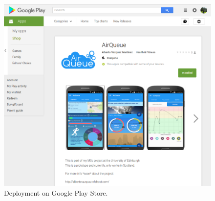 \begin{figure}[H]
\begin{adjustbox}{width=.9\textwidth,center=\textwidth}
  \centering
  \includegraphics[scale=1]{images/play_store.png}
\end{adjustbox}
  \caption[Deployment on Google Play Store]{Deployment on Google Play Store.\footnotemark}
  \label{fig:deployment_play_store}
\end{figure}

